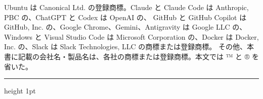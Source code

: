 \documentclass[a4paper,10pt]{ltjsarticle}
\begin{document}
\begin{center}
\begin{minipage}{0.86\linewidth}
{  \vspace{4pt}
  Ubuntu は Canonical Ltd. の登録商標。Claude と Claude Code は Anthropic, PBC の、ChatGPT と Codex は OpenAI の、
  GitHub と GitHub Copilot は GitHub, Inc. の、Google Chrome、Gemini、Antigravity は Google LLC の、
  Windows と Visual Studio Code は Microsoft Corporation の、Docker は Docker, Inc. の、Slack は Slack Technologies, LLC の商標または登録商標。
  その他、本書に記載の会社名・製品名は、各社の商標または登録商標。本文では ™ と ® を省いた。\par}
  \vspace{4pt}
  {\color{accent}\hrule height 1pt}
\end{minipage}
\end{center}
\vspace{18mm}
\end{document}
